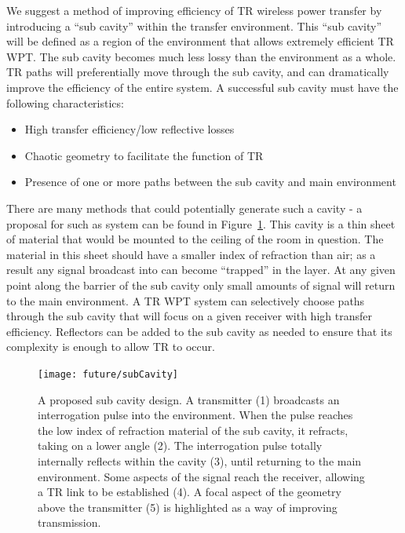We suggest a method of improving efficiency of TR wireless power transfer by introducing a ``sub cavity'' within the transfer environment. This ``sub cavity'' will be defined as a region of the environment that allows extremely efficient TR WPT. The sub cavity becomes much less lossy than the environment as a whole. TR paths will preferentially move through the sub cavity, and can dramatically improve the efficiency of the entire system. A successful sub cavity must have the following characteristics:

\begin{itemize}
  \item High transfer efficiency/low reflective losses
  \item Chaotic geometry to facilitate the function of TR
  \item Presence of one or more paths between the sub cavity and main environment
\end{itemize}

There are many methods that could potentially generate such a cavity - a proposal for such as system can be found in Figure~\ref{fig:subCav}. This cavity is a thin sheet of material that would be mounted to the ceiling of the room in question. The material in this sheet should have a smaller index of refraction than air; as a result any signal broadcast into can become ``trapped'' in the layer. At any given point along the barrier of the sub cavity only small amounts of signal will return to the main environment. A TR WPT system can selectively choose paths through the sub cavity that will focus on a given receiver with high transfer efficiency. Reflectors can be added to the sub cavity as needed to ensure that its complexity is enough to allow TR to occur.

\begin{figure}[h]
\centering
\texttt{[image: future/subCavity]}
\caption[Proposed ``Sub Cavity Design'']{A proposed sub cavity design. A transmitter (1) broadcasts an interrogation pulse into the environment. When the pulse reaches the low index of refraction material of the sub cavity, it refracts, taking on a lower angle (2). The interrogation pulse totally internally reflects within the cavity (3), until returning to the main environment. Some aspects of the signal reach the receiver, allowing a TR link to be established (4). A focal aspect of the geometry above the transmitter (5) is highlighted as a way of improving transmission.}
\label{fig:subCav}
\end{figure}

